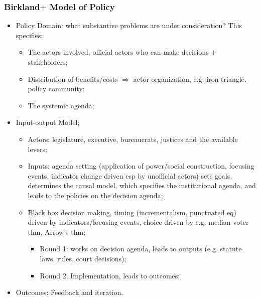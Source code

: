\documentclass[aspectratio=169]{beamer}
\theoremstyle{principle}
\begin{document}
\begin{frame}
\frametitle{Birkland$+$ Model of Policy}
\begin{itemize}
\item Policy Domain: what substantive problems are under consideration?  This specifies:
\begin{itemize}
\item The actors involved, official actors who can make decisions $+$ stakeholders; 
\item Distribution of benefits/costs $\Rightarrow$ actor organization, e.g. iron triangle, policy community;
\item The systemic agenda; 
\end{itemize}
\bigskip
\item \color{black}Input-output Model;
\begin{itemize}
\item Actors: legislature, executive, bureaucrats, justices and the available levers;
\item Inputs: agenda setting (application of power/social construction, focusing events, indicator change driven esp by unofficial actors) sets goals, determines the causal model, which specifies the institutional agenda, and leads to the policies on the decision agenda;
\item Black box decision making, timing (incrementalism, punctuated eq) driven by indicators/focusing events, choice driven by e.g. median voter thm, Arrow's thm;
\begin{itemize}
\item Round 1: works on decision agenda, leads to outputs (e.g. statute laws, rules, court decisions);
\item Round 2: Implementation, leads to outcomes;
 \end{itemize}
\end{itemize}
\bigskip
\item Outcomes: Feedback and iteration.
\end{itemize}
\end{frame}
\end{document}
